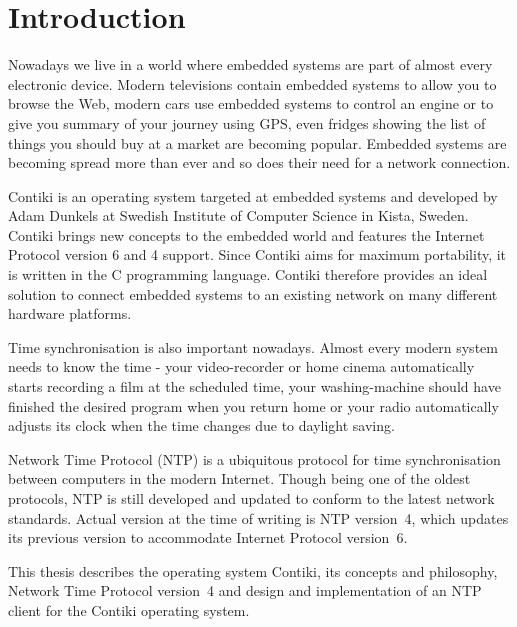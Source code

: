 
\chapter{Introduction}
Nowadays we live in a world where embedded systems are part of almost every electronic device.
Modern televisions contain embedded systems to allow you to browse the Web,
modern cars use embedded systems to control an engine or to give you summary
of your journey using GPS, even fridges showing the list of things you should buy at a market are becoming popular.
Embedded systems are becoming spread more than ever and so does
their need for a network connection.

Contiki is an operating system targeted at embedded systems and
developed by Adam Dunkels at Swedish Institute of Computer Science in Kista, Sweden.
Contiki brings new concepts to the embedded world and features the
Internet Protocol version 6 and 4 support.
Since Contiki aims for maximum portability, it is written in the C programming language.
Contiki therefore provides an ideal solution to connect
embedded systems to an existing network on many different hardware platforms.

Time synchronisation is also important nowadays.
Almost every modern system needs to know the time -
your video-recorder or home cinema automatically starts recording a film at the scheduled time,
your washing-machine should have finished the
desired program when you return home or your radio automatically adjusts its clock when the time changes
due to daylight saving.

Network Time Protocol (NTP) is a ubiquitous protocol for time synchronisation between computers in the modern Internet.
Though being one of the oldest protocols, NTP is still developed and updated to conform to the latest
network standards. Actual version at the time of writing is NTP version~4, which updates its previous version to
accommodate Internet Protocol version~6.

This thesis describes the operating system Contiki, its concepts and philosophy,
Network Time Protocol version~4 and design and implementation of an NTP client for the Contiki operating system.








